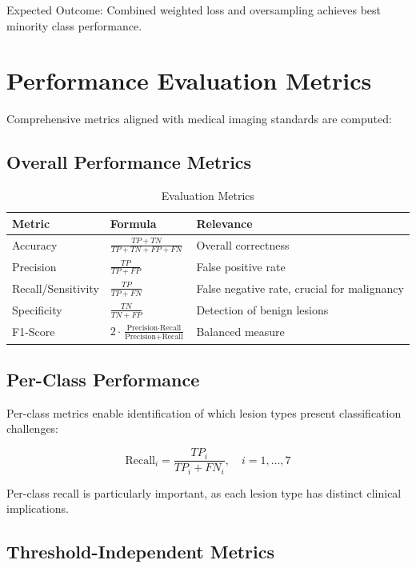 Expected Outcome: Combined weighted loss and oversampling achieves best minority class performance.

\section{Performance Evaluation Metrics}

Comprehensive metrics aligned with medical imaging standards are computed:

\subsection{Overall Performance Metrics}

\begin{table}[H]
\centering
\caption{Evaluation Metrics}
\label{tab:metrics}
\begin{tabular}{|l|l|l|}
\hline
\textbf{Metric} & \textbf{Formula} & \textbf{Relevance} \\
\hline
Accuracy & $\frac{TP + TN}{TP + TN + FP + FN}$ & Overall correctness \\
Precision & $\frac{TP}{TP + FP}$ & False positive rate \\
Recall/Sensitivity & $\frac{TP}{TP + FN}$ & False negative rate, crucial for malignancy \\
Specificity & $\frac{TN}{TN + FP}$ & Detection of benign lesions \\
F1-Score & $2 \cdot \frac{\text{Precision} \cdot \text{Recall}}{\text{Precision} + \text{Recall}}$ & Balanced measure \\
\hline
\end{tabular}
\end{table}

\subsection{Per-Class Performance}

Per-class metrics enable identification of which lesion types present classification challenges:

\begin{equation}
\text{Recall}_i = \frac{TP_i}{TP_i + FN_i}, \quad i = 1, \ldots, 7
\end{equation}

Per-class recall is particularly important, as each lesion type has distinct clinical implications.

\subsection{Threshold-Independent Metrics}

